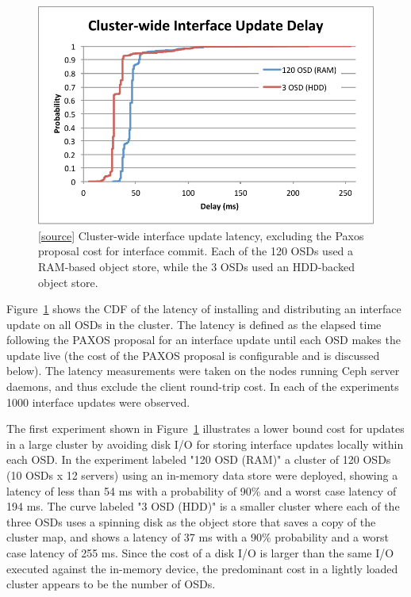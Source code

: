 \documentclass[preprint]{sigplanconf-eurosys}
\begin{document}
\begin{figure}[h]
\centering
\includegraphics[trim={1 4 4 1.3cm},clip]{figures/iface-update-delay.pdf}
\caption{[\href{https://github.com/double-blind-submitter/osdi16}{source}]
Cluster-wide interface update latency, excluding the Paxos proposal cost for
interface commit. Each of the 120 OSDs used a RAM-based object store, while the
3 OSDs used an HDD-backed object store.}
\label{fig:propdelay}
\end{figure}

Figure~\ref{fig:propdelay} shows the CDF of the latency of installing and
distributing an interface update on all OSDs in the cluster. The latency is
defined as the elapsed time following the PAXOS proposal for an interface
update until each OSD makes the update live (the cost of the PAXOS proposal is
configurable and is discussed below). The latency measurements were taken on
the nodes running Ceph server daemons, and thus exclude the client round-trip
cost. In each of the experiments 1000 interface updates were observed.

The first experiment shown in Figure~\ref{fig:propdelay} illustrates a lower
bound cost for updates in a large cluster by avoiding disk I/O for storing
interface updates locally within each OSD.  In the experiment labeled "120 OSD
(RAM)" a cluster of 120 OSDs (10 OSDs x 12 servers) using an in-memory data
store were deployed, showing a latency of less than 54 ms with a probability
of 90\% and a worst case latency of 194 ms. The curve labeled "3 OSD (HDD)" is
a smaller cluster where each of the three OSDs uses a spinning disk as the
object store that saves a copy of the cluster map, and shows a latency of 37
ms with a 90\% probability and a worst case latency of 255 ms. Since the cost
of a disk I/O is larger than the same I/O executed against the in-memory
device, the predominant cost in a lightly loaded cluster appears to be the
number of OSDs.
\end{document}
